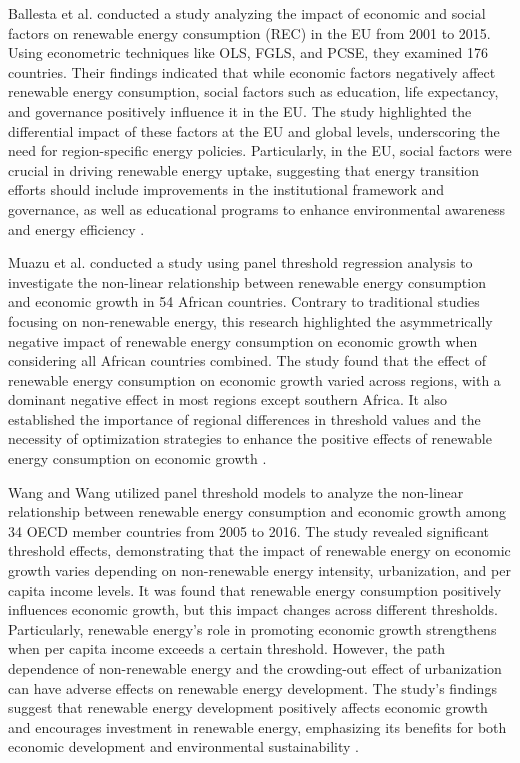 \documentclass[a4paper,11pt]{article}
\begin{document}
Ballesta et al. conducted a study analyzing the impact of economic and social factors on renewable energy consumption (REC) in the EU from 2001 to 2015. Using econometric techniques like OLS, FGLS, and PCSE, they examined 176 countries. Their findings indicated that while economic factors negatively affect renewable energy consumption, social factors such as education, life expectancy, and governance positively influence it in the EU. The study highlighted the differential impact of these factors at the EU and global levels, underscoring the need for region-specific energy policies. Particularly, in the EU, social factors were crucial in driving renewable energy uptake, suggesting that energy transition efforts should include improvements in the institutional framework and governance, as well as educational programs to enhance environmental awareness and energy efficiency \textcite{ref12}.

Muazu et al. conducted a study using panel threshold regression analysis to investigate the non-linear relationship between renewable energy consumption and economic growth in 54 African countries. Contrary to traditional studies focusing on non-renewable energy, this research highlighted the asymmetrically negative impact of renewable energy consumption on economic growth when considering all African countries combined. The study found that the effect of renewable energy consumption on economic growth varied across regions, with a dominant negative effect in most regions except southern Africa. It also established the importance of regional differences in threshold values and the necessity of optimization strategies to enhance the positive effects of renewable energy consumption on economic growth \textcite{ref38}.

Wang and Wang utilized panel threshold models to analyze the non-linear relationship between renewable energy consumption and economic growth among 34 OECD member countries from 2005 to 2016. The study revealed significant threshold effects, demonstrating that the impact of renewable energy on economic growth varies depending on non-renewable energy intensity, urbanization, and per capita income levels. It was found that renewable energy consumption positively influences economic growth, but this impact changes across different thresholds. Particularly, renewable energy's role in promoting economic growth strengthens when per capita income exceeds a certain threshold. However, the path dependence of non-renewable energy and the crowding-out effect of urbanization can have adverse effects on renewable energy development. The study's findings suggest that renewable energy development positively affects economic growth and encourages investment in renewable energy, emphasizing its benefits for both economic development and environmental sustainability \textcite{ref53}.
\end{document}
